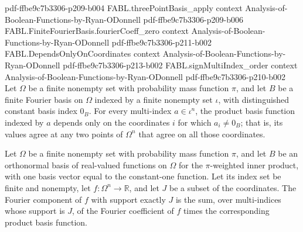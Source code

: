 \begin{theorem}
{    pdf-ffbe9c7b3306-p209-b004}
\proofstep
  {FABL.threePointBasis_apply}
  {context}
  {Analysis-of-Boolean-Functions-by-Ryan-ODonnell}
  {pdf-ffbe9c7b3306-p209-b006}
\proofstep
  {FABL.FiniteFourierBasis.fourierCoeff_zero}
  {context}
  {Analysis-of-Boolean-Functions-by-Ryan-ODonnell}
  {pdf-ffbe9c7b3306-p211-b002}
\proofstep
  {FABL.DependsOnlyOnCoordinates}
  {context}
  {Analysis-of-Boolean-Functions-by-Ryan-ODonnell}
  {pdf-ffbe9c7b3306-p213-b002}
\proofstep
  {FABL.signMultiIndex_order}
  {context}
  {Analysis-of-Boolean-Functions-by-Ryan-ODonnell}
  {pdf-ffbe9c7b3306-p210-b002}
Let $\Omega$ be a finite nonempty set with probability mass function $\pi$, and let $B$
be a finite Fourier basis on $\Omega$ indexed by a finite nonempty set $\iota$, with
distinguished constant basis index $0_B$. For every multi-index $a\in\iota^n$, the
product basis function indexed by $a$ depends only on the coordinates $i$ for which
$a_i\ne 0_B$; that is, its values agree at any two points of $\Omega^n$ that agree on
all those coordinates.
\end{theorem}

\begin{definition}
\label{FABL.FiniteFourierBasis.fourierComponentAtSupport}
\leanok
{}
Let $\Omega$ be a finite nonempty set with probability mass function $\pi$, and let $B$
be an orthonormal basis of real-valued functions on $\Omega$ for the $\pi$-weighted
inner product, with one basis vector equal to the constant-one function. Let its index
set be finite and nonempty, let $f\colon\Omega^n\to\mathbb{R}$, and let $J$ be a subset
of the coordinates. The Fourier component of $f$ with support exactly $J$ is the sum,
over multi-indices whose support is $J$, of the Fourier coefficient of $f$ times the
corresponding product basis function.
\end{definition}

